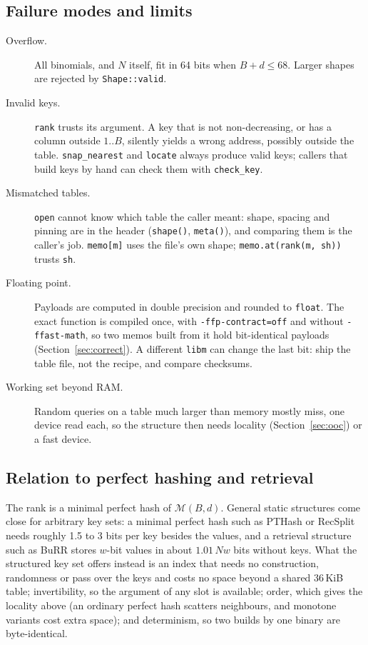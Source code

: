 \documentclass[preprint,12pt]{elsarticle}
\begin{document}
\subsection{Failure modes and limits}\label{sec:failure}
\begin{description}
\item[Overflow.] All binomials, and $N$ itself, fit in 64 bits when $B+d\le68$. Larger shapes are rejected by \texttt{Shape::valid}.
\item[Invalid keys.] \texttt{rank} trusts its argument. A key that is not
non-decreasing, or has a column outside $1..B$, silently yields a wrong address,
possibly outside the table. \texttt{snap\_nearest} and \texttt{locate} always
produce valid keys; callers that build keys by hand can check them with
\texttt{check\_key}.
\item[Mismatched tables.] \texttt{open} cannot know which table the caller meant: shape, spacing and pinning are in the header (\texttt{shape()}, \texttt{meta()}), and comparing them is the caller's job.
\texttt{memo[m]} uses the file's own shape; \texttt{memo.at(rank(m, sh))} trusts
\texttt{sh}.
\item[Floating point.] Payloads are computed in double precision and rounded to
\texttt{float}. The exact function is compiled once, with \texttt{-ffp-contract=off} and without \texttt{-ffast-math}, so two memos built from it hold bit-identical payloads (Section~\ref{sec:correct}). A different \texttt{libm} can change the last bit: ship the table file, not the recipe, and compare checksums.
\item[Working set beyond RAM.] Random queries on a table much larger than memory mostly miss, one device read each, so the structure then needs locality (Section~\ref{sec:ooc}) or a fast device.
\end{description}

\subsection{Relation to perfect hashing and retrieval}\label{sec:mphf}
The rank is a minimal perfect hash of $\mathcal{M}(B,d)$. General static structures
come close for arbitrary key sets:\cite{pagh2001,dietzfelbinger2008} a minimal perfect hash such as PTHash or
RecSplit\cite{pibiri2021,esposito2020} needs roughly 1.5 to 3 bits per key besides
the values, and a retrieval structure such as BuRR\cite{dillinger2022} stores
$w$-bit values in about $1.01\,Nw$ bits without keys. What the structured key set offers instead is an index
that needs no construction, randomness or pass over the keys and costs no space
beyond a shared 36\,KiB table; invertibility, so the argument of any slot is
available; order, which gives the locality above (an ordinary perfect hash scatters neighbours, and monotone
variants\cite{belazzougui2009} cost extra space); and determinism, so two builds by one binary are byte-identical.
\end{document}
